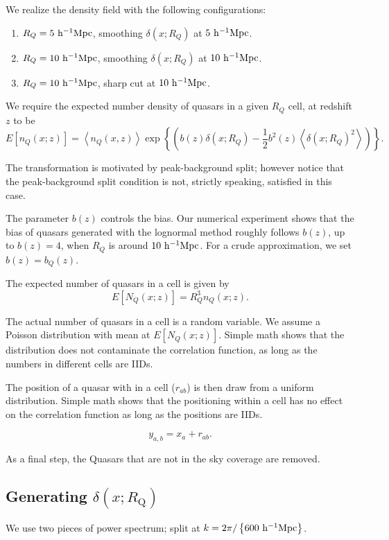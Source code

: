 \documentclass{paper}
\begin{document}
    We realize the density field with the following
            configurations:
    \begin{enumerate}
        \item 
            $R_Q = 5\,\mpch$, smoothing $\delta(x; R_Q)$ at
            $5\,\mpch$.
        \item
            $R_Q = 10\,\mpch$, smoothing $\delta(x; R_Q)$ at
            $10\,\mpch$.
        \item
            $R_Q = 10\,\mpch$, sharp cut at $10\,\mpch$.
    \end{enumerate}


    We require the expected number density of quasars in a given $R_Q$
    cell, at redshift $z$ to be
    \[
        E[n_Q(x; z)] = \left<n_Q(x, z)\right> 
        \exp \left\{\left( 
        b(z) \delta(x; R_Q) - \frac{1}{2}b^2(z)\left<\delta(x;
        R_Q)^2\right>
    \right)\right\}.
    \]

    The transformation is
    motivated by peak-background split; however notice that
    the peak-background split condition is not, strictly
    speaking, satisfied in this case.

    The parameter $b(z)$ controls the bias. Our numerical
    experiment shows that the bias of quasars generated with
    the lognormal method roughly follows $b(z)$, up to
    $b(z)=4$, when $R_Q$ is around $10\,\mpch$. For a crude
    approximation, we set $b(z) = b_Q(z)$.

    The expected number of quasars in a cell is given by 
    \[
        E[N_Q(x; z)] = R_Q^3 n_Q(x; z).
    \]

    The actual number of quasars in a cell is a random
    variable. We assume a Poisson distribution with mean at
    $E[N_Q(x; z)]$. Simple math shows that the distribution 
    does not contaminate the correlation function, as long
    as the numbers in different cells are IIDs.

    The position of a quasar with in a cell ($r_{ab}$) is then draw from a
    uniform distribution. Simple math shows that the
    positioning within a cell has no effect on the
    correlation function as long as the positions are IIDs.

    \[
        y_{a, b} = x_a + r_{ab}.
    \]

    As a final step, the Quasars that are not in the sky coverage are
    removed.

\subsection{Generating $\delta(x; R_\mathrm{Q})$}
    We use two pieces of power spectrum; 
    split at $k = 2\pi / \left\{600\, \mpch \right\}$.
\end{document}
